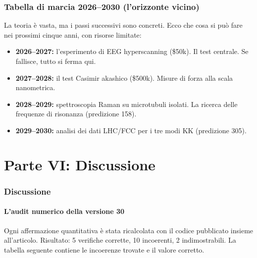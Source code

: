 \documentclass[11pt,a4paper]{article}
\begin{document}
\section{Tabella di marcia 2026--2030 (l'orizzonte vicino)}
La teoria è vasta, ma i passi successivi sono concreti. Ecco che cosa si può fare nei prossimi cinque anni, con risorse limitate:
\begin{itemize}
    \item \textbf{2026--2027:} l'esperimento di EEG hyperscanning (\$50k). Il test centrale. Se fallisce, tutto si ferma qui.
    \item \textbf{2027--2028:} il test Casimir akashico (\$500k). Misure di forza alla scala nanometrica.
    \item \textbf{2028--2029:} spettroscopia Raman su microtubuli isolati. La ricerca delle frequenze di risonanza (predizione 158).
    \item \textbf{2029--2030:} analisi dei dati LHC/FCC per i tre modi KK (predizione 305).
\end{itemize}

\newpage
\part*{Parte VI: Discussione}

\section{Discussione}
\subsection{L'audit numerico della versione 30}
Ogni affermazione quantitativa è stata ricalcolata con il codice pubblicato insieme all'articolo. Risultato: 5 verifiche corrette, 10 incoerenti, 2 indimostrabili. La tabella seguente contiene le incoerenze trovate e il valore corretto.
\end{document}

